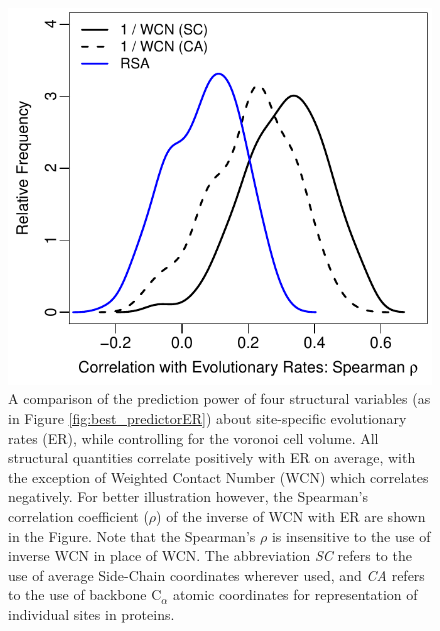 \documentclass[11pt]{article}
\begin{document}
    \begin{figure}
        \begin{center}
        \includegraphics[width=5.5in]{best_structural_predictors_of_ER_given_vol.pdf}
        \end{center}
        \caption{A comparison of the prediction power of four structural variables (as in Figure \ref{fig:best_predictorER}) about site-specific evolutionary rates (ER), while controlling for the voronoi cell volume. All structural quantities correlate positively with ER on average, with the exception of Weighted Contact Number (WCN) which correlates negatively. For better illustration however, the Spearman's correlation coefficient ($\rho$) of the inverse of WCN with ER are shown in the Figure. Note that the Spearman's $\rho$ is insensitive to the use of inverse WCN in place of WCN. The abbreviation {\it SC} refers to the use of average Side-Chain coordinates wherever used, and {\it CA} refers to the use of backbone C$_\alpha$ atomic coordinates for representation of individual sites in proteins.}
        \label{fig:best_predictorER_given_volume}
    \end{figure}
\end{document}
